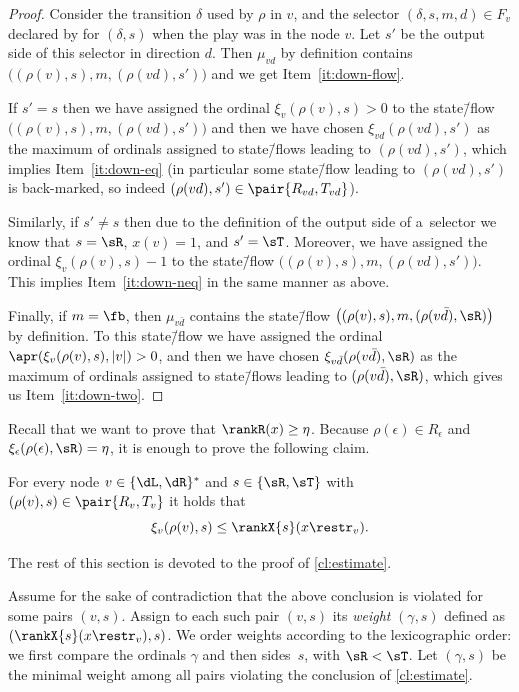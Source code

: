 \begin{proof}	
	Consider the transition $\delta$ used by $\rho$ in $v$,
	and the selector $(\delta,s,m,d)\in F_v$ declared by \eve for $(\delta,s)$ when the play was in the node $v$.
	Let $s'$ be the output side of this selector in direction $d$.
	Then $\mu_{vd}$ by definition contains $\big((\rho(v),s),m,(\rho(vd),s')\big)$ and we get Item~\ref{it:down-flow}.

	If $s'=s$ then we have assigned the ordinal $\xi_v(\rho(v),s)>0$ to the state\=/flow $\big((\rho(v),s),\allowbreak m,\allowbreak (\rho(vd),s')\big)$
	and then we have chosen $\xi_{vd}(\rho(vd),s')$ as the maximum of ordinals assigned to state\=/flows leading to $(\rho(vd),s')$,
	which implies Item~\ref{it:down-eq} (in particular some state\=/flow leading to $(\rho(vd),s')$ is back-marked, so indeed $(\rho(vd),s')\in\pair{R_{vd},T_{vd}}$).
	
	Similarly, if $s'\neq s$ then due to the definition of the output side of a~selector we know that $s=\sR$, $x(v)=1$, and $s'=\sT$.
	Moreover, we have assigned the ordinal $\xi_v(\rho(v),s)-1$ to the state\=/flow $\big((\rho(v),s),m,(\rho(vd),s')\big)$.
	This implies Item~\ref{it:down-neq} in the same manner as above.
	
	Finally, if $m=\fb$, then $\mu_{v\bar{d}}$ contains the state\=/flow $\big((\rho(v),s),m,(\rho(v\bar{d}),\sR)\big)$ by definition.
	To this state\=/flow we have assigned the ordinal $\apr(\xi_v(\rho(v),s),|v|)>0$,
	and then we have chosen $\xi_{v\bar{d}}(\rho(v\bar{d}),\sR)$ as the maximum of ordinals assigned to state\=/flows leading to $(\rho(v\bar{d}),\sR)$,
	which gives us Item~\ref{it:down-two}.
\end{proof}

Recall that we want to prove that $\rankR(x)\geq\eta$.
Because $\rho(\epsilon)\in R_\epsilon$ and $\xi_\epsilon(\rho(\epsilon),\sR)=\eta$, it is enough to prove the following claim.

\begin{clm}
\label{cl:estimate}
	For every node $v\in\{\dL,\dR\}^\ast$ and $s\in\{\sR,\sT\}$ with $(\rho(v),s)\in\pair{R_v,T_v}$ it holds that
	\begin{equation}
	\label{eq:estimate}
	\xi_v(\rho(v),s)\leq\rankX{s}(x\restr_v).
	\end{equation}
\end{clm}

The rest of this section is devoted to the proof of \cref{cl:estimate}.

\noindent %
Assume for the sake of contradiction that the above conclusion is violated for some pairs $(v,s)$.
Assign to each such pair $(v,s)$ its \emph{weight} $(\gamma, s)$ defined as $(\rankX{s}(x\restr_v),s)$.
We order weights according to the lexicographic order: we first compare the ordinals $\gamma$ and then sides~$s$, with $\sR<\sT$.
Let $(\gamma, s)$ be the minimal weight among all pairs violating the conclusion of \cref{cl:estimate}.

